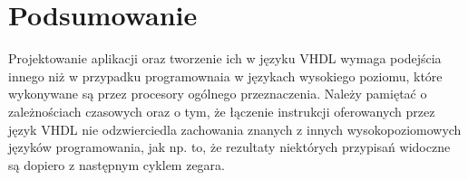 \documentclass[polish,polish,a4paper]{article}
\begin{document}
\section{Podsumowanie}
Projektowanie aplikacji oraz tworzenie ich w języku VHDL wymaga podejścia innego niż w przypadku programownaia w językach wysokiego poziomu, które
wykonywane są przez procesory ogólnego przeznaczenia.
Należy pamiętać o zależnościach czasowych oraz o tym, że łączenie instrukcji oferowanych przez język VHDL nie odzwierciedla zachowania znanych z innych wysokopoziomowych języków programowania, jak np. to, że rezultaty niektórych przypisań widoczne są dopiero z następnym cyklem zegara.
\end{document}
